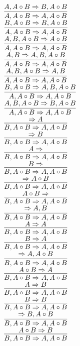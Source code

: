 \documentclass[11pt]{article}
\begin{document}
\begin{center}
\bigskip
\\$\infer{A, A\circ B\Rightarrow A, A\circ B}{A, A\circ B\Rightarrow B, A\circ B}$
\bigskip
\\$\infer{A, A\circ B\Rightarrow A, A\circ B}{B, A\circ B\Rightarrow B, A\circ B}$
\bigskip
\\$\infer{A, A\circ B\Rightarrow A, A\circ B}{A, B, A\circ B\Rightarrow A\circ B}$
\bigskip
\\$\infer{A, A\circ B\Rightarrow A, A\circ B}{A, B\Rightarrow A, B, A\circ B}$
\bigskip
\\$\infer{A, A\circ B\Rightarrow A, A\circ B}{A, B, A\circ B\Rightarrow A, B}$
\bigskip
\\$\infer{A, A\circ B\Rightarrow A, A\circ B}{B, A\circ B\Rightarrow A, B, A\circ B}$
\bigskip
\\$\infer{A, A\circ B\Rightarrow A, A\circ B}{A, B, A\circ B\Rightarrow B, A\circ B}$
\bigskip
\\$\infer{B, A\circ B\Rightarrow A, A\circ B}{\Rightarrow A}$
\bigskip
\\$\infer{B, A\circ B\Rightarrow A, A\circ B}{\Rightarrow B}$
\bigskip
\\$\infer{B, A\circ B\Rightarrow A, A\circ B}{A\Rightarrow }$
\bigskip
\\$\infer{B, A\circ B\Rightarrow A, A\circ B}{B\Rightarrow }$
\bigskip
\\$\infer{B, A\circ B\Rightarrow A, A\circ B}{\Rightarrow A\circ B}$
\bigskip
\\$\infer{B, A\circ B\Rightarrow A, A\circ B}{A\circ B\Rightarrow }$
\bigskip
\\$\infer{B, A\circ B\Rightarrow A, A\circ B}{\Rightarrow A, B}$
\bigskip
\\$\infer{B, A\circ B\Rightarrow A, A\circ B}{A\Rightarrow A}$
\bigskip
\\$\infer{B, A\circ B\Rightarrow A, A\circ B}{B\Rightarrow A}$
\bigskip
\\$\infer{B, A\circ B\Rightarrow A, A\circ B}{\Rightarrow A, A\circ B}$
\bigskip
\\$\infer{B, A\circ B\Rightarrow A, A\circ B}{A\circ B\Rightarrow A}$
\bigskip
\\$\infer{B, A\circ B\Rightarrow A, A\circ B}{A\Rightarrow B}$
\bigskip
\\$\infer{B, A\circ B\Rightarrow A, A\circ B}{B\Rightarrow B}$
\bigskip
\\$\infer{B, A\circ B\Rightarrow A, A\circ B}{\Rightarrow B, A\circ B}$
\bigskip
\\$\infer{B, A\circ B\Rightarrow A, A\circ B}{A\circ B\Rightarrow B}$

\end{center}
\end{document}
